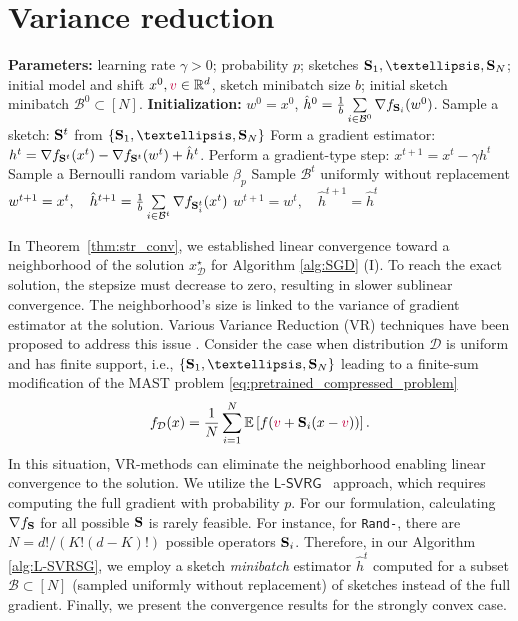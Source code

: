 \documentclass{article}
\newcommand{\rnd}[1]{{\texttt{Rand-}}#1}
\newcommand{\shift}{{\color{purple}s}}
\newcommand{\lsvrg}{$\mathsf{L}$-$\mathsf{SVRG}$~}
\newcommand{\bb}{\mathbb}
\newcommand{\R}{\bb R}
\newcommand{\cD}{\mathcal{D}}
\theoremstyle{plain}
\newcommand{\tf}{f_{\mathcal{D}}}
\renewcommand{\shift}{{\color{purple}v}}
\newcommand{\mS}{{\bf S}}
\theoremstyle{plain}
\theoremstyle{definition}
\theoremstyle{remark}
\begin{document}
\section{Variance reduction} \label{sec:variance_reduction}
\begin{algorithm}[t]
\begin{algorithmic}[1]
\caption{Loopless Stochastic Variance Reduced Double Sketched Gradient ($\mathsf{L}$-$\mathsf{SVRDSG}$)} \label{alg:L-SVRSG}
    \STATE \textbf{Parameters:} learning rate $\gamma > 0$; probability $p$; sketches $\mS_1, \ldots, \mS_{N}$; initial model and shift $x^0, \shift \in \R^d$, sketch minibatch size $b$; initial sketch minibatch $\mathcal{B}^0 \subset [N]$.
    \STATE \textbf{Initialization: } $w^0=x^0$, $\hat{h}^0 = \frac{1}{b}\sum \limits_{i \in \mathcal{B}^0}\nabla f_{\mS_i}(w^0)$.
    \STATE Sample a sketch: $\mS^t$ from $\{\mS_1, \ldots, \mS_{N}\}$
    \STATE Form a gradient estimator: $h^t = \nabla f_{\mS^t}(x^t) - \nabla f_{\mS^t}(w^t) + \hat{h}^t$.
    \STATE Perform a gradient-type step: $x^{t+1} = x^t - \gamma h^t$
    \STATE Sample a Bernoulli random variable $\beta_p$
        \STATE Sample $\mathcal{B}^{t}$ uniformly without replacement
       \STATE $w^{t+1} = x^t, \quad \hat{h}^{t+1} = \frac{1}{b}\sum \limits_{i \in \mathcal{B}^{t}}\nabla f_{\mS^t_i}(x^{t}) $
    \ELSE
        \STATE $w^{t+1} = w^t , \quad \hat{h}^{t+1} = \hat{h}^{t}$
    \ENDIF
    \ENDFOR
\end{algorithmic}
\end{algorithm}
In Theorem~\ref{thm:str_conv}, we established linear convergence toward a neighborhood of the solution $x_\cD^\star$ for Algorithm \ref{alg:SGD} (I). To reach the exact solution, the stepsize must decrease to zero, resulting in slower sublinear convergence. The neighborhood's size is linked to the variance of gradient estimator at the solution. Various Variance Reduction (VR) techniques have been proposed to address this issue \citep{gower2020variance}.
Consider the case when distribution $\cD$ is uniform and has finite support, i.e., $\{\mS_1, \dots, \mS_N\}$ leading to a finite-sum modification of the MAST problem \eqref{eq:pretrained_compressed_problem}
\begin{equation} \label{eq:fin_sum}
    \tf(x) = \frac{1}{N} \sum_{i=1}^N \mathbb{E}\left[f(\shift + \mS_i(x - \shift))\right].
\end{equation}
In this situation, VR-methods can eliminate the neighborhood enabling linear convergence to the solution.
We utilize the \lsvrg \citep{kovalev2020don, hofmann2015variance} approach, which requires computing the full gradient with probability $p$.
For our formulation, calculating $\nabla f_{\mS}$ for all possible $\mS$ is rarely feasible. For instance, for \rnd{}, there are
$N = d!/(K!(d-K)!)$ possible operators $\mS_i$.
Therefore, in our Algorithm \ref{alg:L-SVRSG}, we employ a sketch \textit{minibatch} estimator $\hat{h}^t$ computed for a subset $\mathcal{B} \subset [N]$ (sampled uniformly without replacement) of sketches instead of the full gradient.
Finally, we present the convergence results for the strongly convex case.
\end{document}
